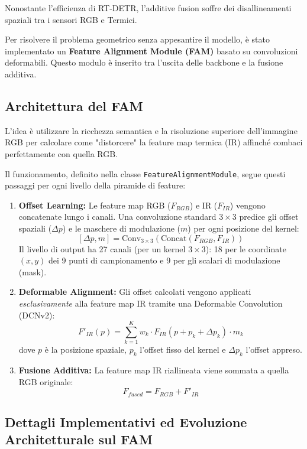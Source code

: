 \documentclass[a4paper,11pt]{article}
\begin{document}
Nonostante l'efficienza di RT-DETR, l'additive fusion soffre dei disallineamenti spaziali tra i sensori RGB e Termici.

Per risolvere il problema geometrico senza appesantire il modello, è stato implementato un \textbf{Feature Alignment Module (FAM)} basato su convoluzioni deformabili. Questo modulo è inserito tra l'uscita delle backbone e la fusione additiva.

\subsection{Architettura del FAM}
L'idea è utilizzare la ricchezza semantica e la risoluzione superiore dell'immagine RGB per calcolare come "distorcere" la feature map termica (IR) affinché combaci perfettamente con quella RGB.

Il funzionamento, definito nella classe \texttt{FeatureAlignmentModule}, segue questi passaggi per ogni livello della piramide di feature:

\begin{enumerate}
    \item \textbf{Offset Learning:} Le feature map RGB ($F_{RGB}$) e IR ($F_{IR}$) vengono concatenate lungo i canali. Una convoluzione standard $3\times3$ predice gli offset spaziali ($\Delta p$) e le maschere di modulazione ($m$) per ogni posizione del kernel:
    $$ [\Delta p, m] = \text{Conv}_{3\times3}(\text{Concat}(F_{RGB}, F_{IR})) $$
    Il livello di output ha 27 canali (per un kernel $3\times3$): 18 per le coordinate $(x,y)$ dei 9 punti di campionamento e 9 per gli scalari di modulazione (mask).
    
    \item \textbf{Deformable Alignment:} Gli offset calcolati vengono applicati \textit{esclusivamente} alla feature map IR tramite una Deformable Convolution (DCNv2):
    $$ F'_{IR}(p) = \sum_{k=1}^{K} w_k \cdot F_{IR}(p + p_k + \Delta p_k) \cdot m_k $$
    dove $p$ è la posizione spaziale, $p_k$ l'offset fisso del kernel e $\Delta p_k$ l'offset appreso.
    
    \item \textbf{Fusione Additiva:} La feature map IR riallineata viene sommata a quella RGB originale:
    $$ F_{fused} = F_{RGB} + F'_{IR} $$
\end{enumerate}

\subsection{Dettagli Implementativi ed Evoluzione Architetturale sul FAM}
 
\end{document}
